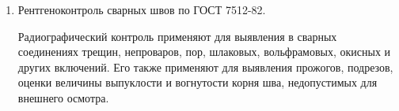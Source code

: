 \begin{enumerate}
    РД 26-12-29-88 <<Правила проведения пневматических испытаний изделий на прочность и герметичность>> устанавливает организацию и порядок проведения работ и общие требования безопасности при проведении пневматических испытаний, а также к устройству, размещению и эксплуатации стендов, установок и сооружений, предназначенных для этих целей.

    ГОСТ 28517-90 <<Масс-спектрометрический метод течеискания>> устанавливает общие требования к контролю герметичности. Его применяют для проведении испытаний на герметичность при регистрации потоков в диапазоне от $10^{-14}$ до $10^{-2} \; \t{Вт}$.
    \item Рентгеноконтроль сварных швов по ГОСТ 7512-82.
    
    Радиографический контроль применяют для выявления в сварных соединениях трещин, непроваров, пор, шлаковых, вольфрамовых, окисных и других включений. Его также применяют для выявления прожогов, подрезов, оценки величины выпуклости и вогнутости корня шва, недопустимых для внешнего осмотра.
\end{enumerate}
